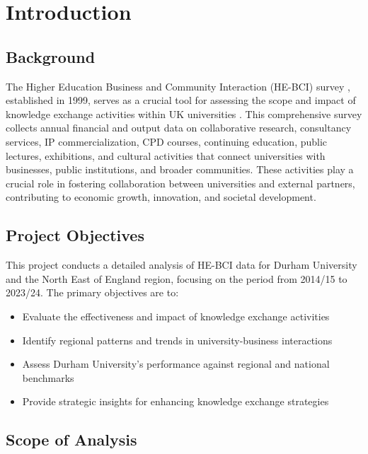 \documentclass[journal,onecolumn, 10pt,draftclsnofoot]{IEEEtran}
\begin{document}
\section{Introduction}

\subsection{Background}

The Higher Education Business and Community Interaction (HE-BCI) survey \cite{hesa_he_bci_2024}, established in 1999, serves as a crucial tool for assessing the scope and impact of knowledge exchange activities within UK universities \cite{etzkowitz2000dynamics,perkmann2013academic}. This comprehensive survey collects annual financial and output data on collaborative research, consultancy services, IP commercialization, CPD courses, continuing education, public lectures, exhibitions, and cultural activities that connect universities with businesses, public institutions, and broader communities. These activities play a crucial role in fostering collaboration between universities and external partners, contributing to economic growth, innovation, and societal development.

\subsection{Project Objectives}

This project conducts a detailed analysis of HE-BCI data for Durham University and the North East of England region, focusing on the period from 2014/15 to 2023/24. The primary objectives are to:
\begin{itemize}
    \item Evaluate the effectiveness and impact of knowledge exchange activities
    \item Identify regional patterns and trends in university-business interactions
    \item Assess Durham University's performance against regional and national benchmarks
    \item Provide strategic insights for enhancing knowledge exchange strategies
\end{itemize}

\subsection{Scope of Analysis}
\end{document}
